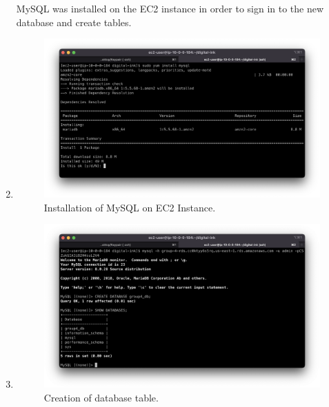 \begin{enumerate}
    MySQL was installed on the EC2 instance in order to sign in to the new database and create tables.

    \item
    \begin{figure}[H]
    \centering
    \includegraphics[width=\textwidth]{resources/rds/rds-mysql-install}
    \caption{Installation of MySQL on EC2 Instance.}
    \label{fig:rds-msql-install}
    \end{figure}

    \item
    \begin{figure}[H]
    \centering
    \includegraphics[width=\textwidth]{resources/rds/rds-database-creation}
    \caption{Creation of database table.}
    \label{fig:rds-db-create-2}
    \end{figure}


\end{enumerate}
